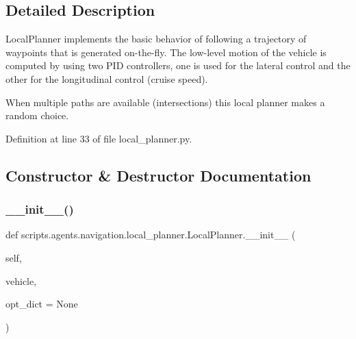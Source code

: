 \subsection{Detailed Description}
\begin{DoxyVerb}LocalPlanner implements the basic behavior of following a trajectory of waypoints that is generated on-the-fly.
The low-level motion of the vehicle is computed by using two PID controllers, one is used for the lateral control
and the other for the longitudinal control (cruise speed).

When multiple paths are available (intersections) this local planner makes a random choice.
\end{DoxyVerb}
 

Definition at line 33 of file local\+\_\+planner.\+py.



\subsection{Constructor \& Destructor Documentation}
\mbox{\label{classscripts_1_1agents_1_1navigation_1_1local__planner_1_1LocalPlanner_a5b8240f8fa0bc5920546f2df4393e22d}} 
\subsubsection{\texorpdfstring{\+\_\+\+\_\+init\+\_\+\+\_\+()}{\_\_init\_\_()}}
{\footnotesize\ttfamily def scripts.\+agents.\+navigation.\+local\+\_\+planner.\+Local\+Planner.\+\_\+\+\_\+init\+\_\+\+\_\+ (\begin{DoxyParamCaption}\item[{}]{self,  }\item[{}]{vehicle,  }\item[{}]{opt\+\_\+dict = {\ttfamily None} }\end{DoxyParamCaption})}

